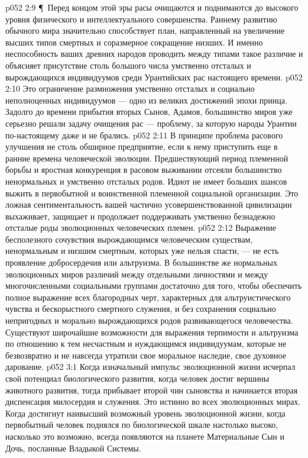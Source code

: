 \vs p052 2:9 \P\ Перед концом этой эры расы очищаются и поднимаются до высокого уровня физического и интеллектуального совершенства. Раннему развитию обычного мира значительно способствует план, направленный на увеличение высших типов смертных и соразмерное сокращение низших. И именно неспособность ваших древних народов проводить между типами такое различие и объясняет присутствие столь большого числа умственно отсталых и вырождающихся индивидуумов среди Урантийских рас настоящего времени.
\vs p052 2:10 Это ограничение размножения умственно отсталых и социально неполноценных индивидуумов --- одно из великих достижений эпохи принца. Задолго до времени прибытия вторых Сынов, Адамов, большинство миров уже серьезно решали задачу очищения рас --- проблему, за которую народы Урантии по\hyp{}настоящему даже и не брались.
\vs p052 2:11 В принципе проблема расового улучшения не столь обширное предприятие, если к нему приступить еще в ранние времена человеческой эволюции. Предшествующий период племенной борьбы и яростная конкуренция в расовом выживании отсеяли большинство ненормальных и умственно отсталых родов. Идиот не имеет больших шансов выжить в первобытной и воинственной племенной социальной организации. Это ложная сентиментальность вашей частично усовершенствованной цивилизации выхаживает, защищает и продолжает поддерживать умственно безнадежно отсталые роды эволюционных человеческих племен.
\vs p052 2:12 Выражение бесполезного сочувствия вырождающимся человеческим существам, ненормальным и низшим смертным, которых уже нельзя спасти, --- не есть проявление добросердечия или альтруизма. В большинстве же нормальных эволюционных миров различий между отдельными личностями и между многочисленными социальными группами достаточно для того, чтобы обеспечить полное выражение всех благородных черт, характерных для альтруистического чувства и бескорыстного смертного служения, и без сохранения социально непригодных и морально вырождающихся родов развивающегося человечества. Существуют широчайшие возможности для выражения терпимости и альтруизма по отношению к тем несчастным и нуждающимся индивидуумам, которые не безвозвратно и не навсегда утратили свое моральное наследие, свое духовное дарование.
\vs p052 3:1 Когда изначальный импульс эволюционной жизни исчерпал свой потенциал биологического развития, когда человек достиг вершины животного развития, тогда прибывает второй чин сыновства и начинается вторая диспенсация милосердия и служения. Это истинно во всех эволюционных мирах. Когда достигнут наивысший возможный уровень эволюционной жизни, когда первобытный человек поднялся по биологической шкале настолько высоко, насколько это возможно, всегда появляются на планете Материальные Сын и Дочь, посланные Владыкой Системы.
